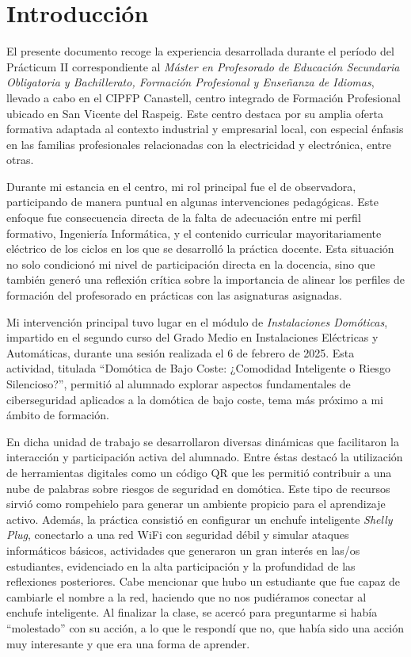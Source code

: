\chapter{Introducción}
El presente documento recoge la experiencia desarrollada durante el período del Prácticum II correspondiente al \textit{Máster en Profesorado de Educación Secundaria Obligatoria y Bachillerato, Formación Profesional y Enseñanza de Idiomas}, llevado a cabo en el CIPFP Canastell, centro integrado de Formación Profesional ubicado en San Vicente del Raspeig. Este centro destaca por su amplia oferta formativa adaptada al contexto industrial y empresarial local, con especial énfasis en las familias profesionales relacionadas con la electricidad y electrónica, entre otras.

Durante mi estancia en el centro, mi rol principal fue el de observadora, participando de manera puntual en algunas intervenciones pedagógicas. Este enfoque fue consecuencia directa de la falta de adecuación entre mi perfil formativo, Ingeniería Informática, y el contenido curricular mayoritariamente eléctrico de los ciclos en los que se desarrolló la práctica docente. Esta situación no solo condicionó mi nivel de participación directa en la docencia, sino que también generó una reflexión crítica sobre la importancia de alinear los perfiles de formación del profesorado en prácticas con las asignaturas asignadas.

Mi intervención principal tuvo lugar en el módulo de \textit{Instalaciones Domóticas}, impartido en el segundo curso del Grado Medio en Instalaciones Eléctricas y Automáticas, durante una sesión realizada el 6 de febrero de 2025. Esta actividad, titulada ``Domótica de Bajo Coste: ¿Comodidad Inteligente o Riesgo Silencioso?'', permitió al alumnado explorar aspectos fundamentales de ciberseguridad aplicados a la domótica de bajo coste, tema más próximo a mi ámbito de formación.

En dicha unidad de trabajo se desarrollaron diversas dinámicas que facilitaron la interacción y participación activa del alumnado. Entre éstas destacó la utilización de herramientas digitales como un código QR que les permitió contribuir a una nube de palabras sobre riesgos de seguridad en domótica. Este tipo de recursos sirvió como rompehielo para generar un ambiente propicio para el aprendizaje activo. Además, la práctica consistió en configurar un enchufe inteligente \textit{Shelly Plug}, conectarlo a una red WiFi con seguridad débil y simular ataques informáticos básicos, actividades que generaron un gran interés en las/os estudiantes, evidenciado en la alta participación y la profundidad de las reflexiones posteriores.
Cabe mencionar que hubo un estudiante que fue capaz de cambiarle el nombre a la red, haciendo que no nos pudiéramos conectar al enchufe inteligente. Al finalizar la clase, se acercó para preguntarme si había ``molestado'' con su acción, a lo que le respondí que no, que había sido una acción muy interesante y que era una forma de aprender.

